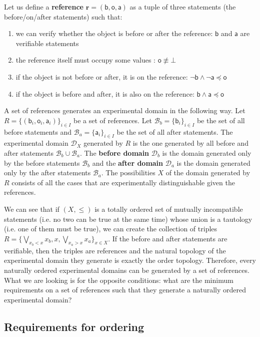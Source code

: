 \documentclass{article}
\def\AND{\wedge}
\def\bigOR{\bigvee}
\def\NOT{\neg}
\def\contradiction{\bot} %
\newcommand{\stmt}[1][s] {\mathsf{#1}} %
\def\narrower{\preccurlyeq} %
\newcommand{\edomain}[1][D] {\mathcal{#1}} %
\newcommand{\basis}[1][B] {\mathcal{#1}} %
\newcommand{\refStmt}[1][r]{\textbf{#1}}
\begin{document}
Let us define a \textbf{reference} $\refStmt = ( \stmt[b], \stmt[o], \stmt[a] )$ as a tuple of three statements (the before/on/after statements) such that:
\begin{enumerate}
	\item we can verify whether the object is before or after the reference: $\stmt[b]$ and $\stmt[a]$ are verifiable statements
	\item the reference itself must occupy some values : $\stmt[o] \nequiv \contradiction$
	\item if the object is not before or after, it is on the reference: $\NOT \stmt[b] \AND \NOT \stmt[a] \narrower \stmt[o]$
	\item if the object is before and after, it is also on the reference: $\stmt[b] \AND \stmt[a] \narrower \stmt[o]$
\end{enumerate}
A set of references generates an experimental domain in the following way. Let $R = \{( \stmt[b]_i, \stmt[o]_i, \stmt[a]_i )\}_{i \in I}$ be a set of references. Let $\basis_b = \{\stmt[b]_i\}_{i \in I}$ be the set of all before statements and $\basis_a = \{\stmt[a]_i\}_{i \in I}$ be the set of all after statements. The experimental domain $\edomain_X$ generated by $R$ is the one generated by all before and after statements $\basis_b \cup \basis_a$. The \textbf{before domain} $\edomain_b$ is the domain generated only by the before statements $\basis_b$ and the \textbf{after domain} $\edomain_a$ is the domain generated only by the after statements $\basis_a$. The possibilities $X$ of the domain generated by $R$ consists of all the cases that are experimentally distinguishable given the references.

We can see that if $(X, \leq)$ is a totally ordered set of mutually incompatible statements (i.e. no two can be true at the same time) whose union is a tautology (i.e. one of them must be true), we can create the collection of triples $R = \{ \bigOR\limits_{x_b < x} x_b , x , \bigOR\limits_{x_a > x} x_a \}_{x \in X}$. If the before and after statements are verifiable, then the triples are references and the natural topology of the experimental domain they generate is exactly the order topology. Therefore, every naturally ordered experimental domains can be generated by a set of references. What we are looking is for the opposite conditions: what are the minimum requirements on a set of references such that they generate a naturally ordered experimental domain?

\subsection*{Requirements for ordering}
\end{document}
